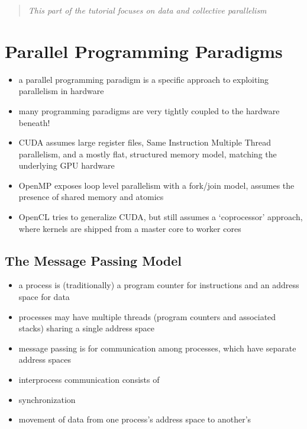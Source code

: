 \documentclass{article}
\begin{document}
    \begin{quote}
\emph{This part of the tutorial focuses on data and collective
parallelism}
\end{quote}

    \section{Parallel Programming
Paradigms}\label{parallel-programming-paradigms}

\begin{itemize}
\item
  a parallel programming paradigm is a specific approach to exploiting
  parallelism in hardware
\item
  many programming paradigms are very tightly coupled to the hardware
  beneath!
\item
  CUDA assumes large register files, Same Instruction Multiple Thread
  parallelism, and a mostly flat, structured memory model, matching the
  underlying GPU hardware
\item
  OpenMP exposes loop level parallelism with a fork/join model, assumes
  the presence of shared memory and atomics
\item
  OpenCL tries to generalize CUDA, but still assumes a `coprocessor'
  approach, where kernels are shipped from a master core to worker cores
\end{itemize}

    \subsection{The Message Passing Model}\label{the-message-passing-model}

\begin{itemize}
\item
  a process is (traditionally) a program counter for instructions and an
  address space for data
\item
  processes may have multiple threads (program counters and associated
  stacks) sharing a single address space
\item
  message passing is for communication among processes, which have
  separate address spaces
\item
  interprocess communication consists of
\item
  synchronization
\item
  movement of data from one process's address space to another's
\end{itemize}
\end{document}
